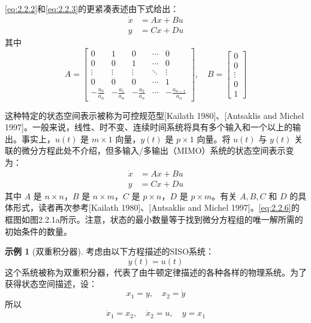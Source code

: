 \documentclass[UTF8,12pt,a4paper]{ctexart}
\theoremstyle{definition}
\newtheorem{example}{示例}[section]
\begin{document}
\eqref{eq:2.2.2}和\eqref{eq:2.2.3}的更紧凑表述由下式给出：
\begin{equation}\label{eq:2.2.4}
\begin{aligned}
\dot{x} &= Ax + Bu \\
y &= Cx + Du
\end{aligned}
\end{equation}
其中
\begin{equation}\label{eq:2.2.5}
A = \begin{bmatrix}
0 & 1 & 0 & \cdots & 0 \\
0 & 0 & 1 & \cdots & 0 \\
\vdots & \vdots & \vdots & \ddots & \vdots \\
0 & 0 & 0 & \cdots & 1 \\
-\frac{a_0}{a_n} & -\frac{a_1}{a_n} & -\frac{a_2}{a_n} & \cdots & -\frac{a_{n-1}}{a_n}
\end{bmatrix}, \quad
B = \begin{bmatrix} 0 \\ 0 \\ \vdots \\ 0 \\ 1 \end{bmatrix}
\end{equation}

这种特定的状态空间表示被称为可控规范型[Kailath 1980]、[Antsaklis and Michel 1997]。一般来说，线性、时不变、连续时间系统将具有多个输入和一个以上的输出。事实上，$u(t)$ 是 $m \times 1$ 向量，$y(t)$ 是 $p \times 1$ 向量。将 $u(t)$ 与 $y(t)$ 关联的微分方程此处不介绍，但多输入/多输出（MIMO）系统的状态空间表示变为：
\begin{equation}\label{eq:2.2.6}
\begin{aligned}
\dot{x} &= Ax + Bu \\
y &= Cx + Du
\end{aligned}
\end{equation}
其中 $A$ 是 $n \times n$，$B$ 是 $n \times m$，$C$ 是 $p \times n$，$D$ 是 $p \times m$。有关 $A, B, C$ 和 $D$ 的具体形式，读者再次参考[Kailath 1980]、[Antsaklis and Michel 1997]。\eqref{eq:2.2.6}的框图如图2.2.1a所示。注意，状态的最小数量等于找到微分方程组的唯一解所需的初始条件的数量。

\begin{example}[双重积分器]
考虑由以下方程描述的SISO系统：
\[
\ddot{y}(t) = u(t)
\]
这个系统被称为双重积分器，代表了由牛顿定律描述的各种各样的物理系统。为了获得状态空间描述，设：
\[
x_1 = y, \quad x_2 = \dot{y}
\]
所以
\[
\dot{x}_1 = x_2, \quad \dot{x}_2 = u, \quad y = x_1
\]
\end{example}
\end{document}
